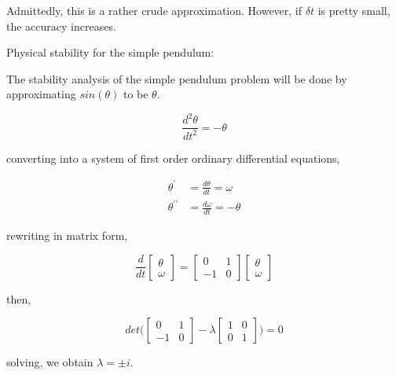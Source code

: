 \documentclass[a4paper,11pt]{report}
\begin{document}
\begin{enumerate}
    Admittedly, this is a rather crude approximation. However, if $\delta t$ is pretty
    small, the accuracy increases.

    Physical stability for the simple pendulum:
    
    The stability analysis of the simple pendulum problem will be done by 
    approximating $sin(\theta)$ to be $\theta$.

    \begin{equation*}
    \frac{d^2 \theta}{dt^2} = - \theta
    \end{equation*}

    converting into a system of first order ordinary differential equations,

    \begin{equation*}
    \begin{aligned}
    \theta^{\prime} &= \frac{d \theta}{dt} = \omega \\
    \theta^{\prime\prime} &= \frac{d \omega}{dt} = - \theta
    \end{aligned}
    \end{equation*}

    rewriting in matrix form,
        
    \begin{equation*}
    \frac{d}{dt} \begin{bmatrix} \theta \\ \omega \end{bmatrix} = \begin{bmatrix} 0 & 1 \\ -1 & 0 \end{bmatrix} \begin{bmatrix} \theta \\ \omega \end{bmatrix}
    \end{equation*}

    then,

    \begin{equation*}
    det \Bigg( \begin{bmatrix} 0 & 1 \\ -1 & 0 \end{bmatrix} - \lambda \begin{bmatrix} 1 & 0 \\ 0 & 1 \end{bmatrix} \Bigg) = 0
    \end{equation*}

    solving, we obtain $\lambda = \pm i$.


\end{enumerate}
\end{document}
